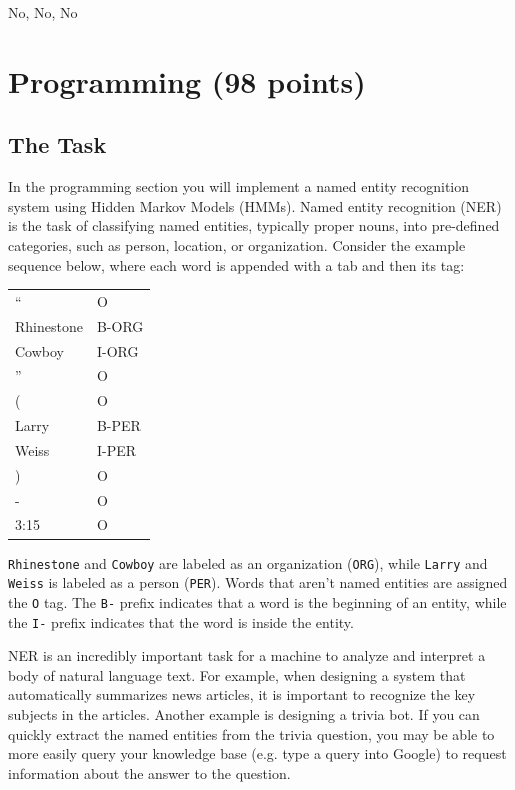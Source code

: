 \documentclass[11pt,addpoints,answers]{exam}
\begin{document}
\begin{your_solution}[height=6cm]
No, No, No

\end{your_solution}

\newpage
\section{Programming (98 points)}
\label{programming}

\subsection{The Task}\label{task}
In the programming section you will implement a named entity recognition system using Hidden Markov Models (HMMs). Named entity recognition (NER) is the task of classifying named entities, typically proper nouns,  into pre-defined categories, such as person, location, or organization. Consider the example sequence below, where each word is appended with a tab and then its tag:

\begin{tabular}{ m{3cm}  m{3cm} } 
    `` & O \\
    Rhinestone & B-ORG \\
    Cowboy & I-ORG \\
    '' & O \\
    ( & O \\
    Larry & B-PER \\
    Weiss & I-PER \\
    ) & O \\ 
    - & O \\
    3:15 & O
\end{tabular}

 \texttt{Rhinestone} and \texttt{Cowboy} are labeled as an organization (\texttt{ORG}), while \texttt{Larry} and \texttt{Weiss} is labeled as a person (\texttt{PER}). Words that aren't named entities are assigned the \texttt{O} tag. The \texttt{B-} prefix indicates that a word is the beginning of an entity, while the \texttt{I-} prefix indicates that the word is inside the entity.

NER is an incredibly important task for a machine to analyze and interpret a body of natural language text. For example, when designing a system that automatically summarizes news articles, it is important to recognize the key subjects in the articles. Another example is designing a trivia bot. If you can quickly extract the named entities from the trivia question, you may be able to more easily query your knowledge base (e.g. type a query into Google) to request information about the answer to the question.
\end{document}
